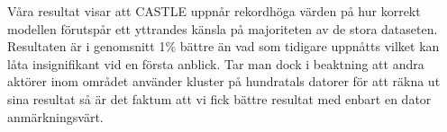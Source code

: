 \documentclass{popsci}
\begin{document}
{%


Våra resultat visar att CASTLE uppnår rekordhöga värden på hur korrekt modellen förutspår ett yttrandes känsla på majoriteten av de stora dataseten. Resultaten är i genomsnitt 1$\%$ bättre än vad som tidigare uppnåtts vilket kan låta insignifikant vid en första anblick. Tar man dock i beaktning att andra aktörer inom området använder kluster på hundratals datorer för att räkna ut sina resultat så är det faktum att vi fick bättre resultat med enbart en dator anmärkningsvärt. 

}
\end{document}
